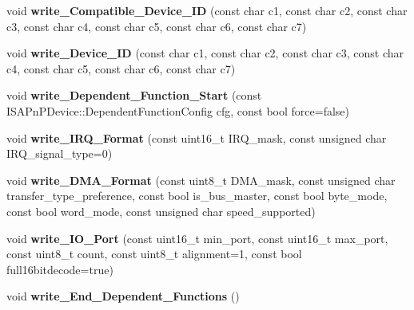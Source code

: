 \begin{DoxyCompactItemize}
\item 
\hypertarget{classISAPnPDevice_a82333984e29355de6aa136cbf42650f2}{void {\bfseries write\-\_\-\-Compatible\-\_\-\-Device\-\_\-\-I\-D} (const char c1, const char c2, const char c3, const char c4, const char c5, const char c6, const char c7)}\label{classISAPnPDevice_a82333984e29355de6aa136cbf42650f2}

\item 
\hypertarget{classISAPnPDevice_a78ce0d3cb8d04542b75360fdd5fdbe50}{void {\bfseries write\-\_\-\-Device\-\_\-\-I\-D} (const char c1, const char c2, const char c3, const char c4, const char c5, const char c6, const char c7)}\label{classISAPnPDevice_a78ce0d3cb8d04542b75360fdd5fdbe50}

\item 
\hypertarget{classISAPnPDevice_ab4252c5d2c75204386a1e5f16b0e0055}{void {\bfseries write\-\_\-\-Dependent\-\_\-\-Function\-\_\-\-Start} (const I\-S\-A\-Pn\-P\-Device\-::\-Dependent\-Function\-Config cfg, const bool force=false)}\label{classISAPnPDevice_ab4252c5d2c75204386a1e5f16b0e0055}

\item 
\hypertarget{classISAPnPDevice_a4b9d92daa7f3303e08504d731bba5b97}{void {\bfseries write\-\_\-\-I\-R\-Q\-\_\-\-Format} (const uint16\-\_\-t I\-R\-Q\-\_\-mask, const unsigned char I\-R\-Q\-\_\-signal\-\_\-type=0)}\label{classISAPnPDevice_a4b9d92daa7f3303e08504d731bba5b97}

\item 
\hypertarget{classISAPnPDevice_aa37664f583dfa6bbffe21b1efae1088f}{void {\bfseries write\-\_\-\-D\-M\-A\-\_\-\-Format} (const uint8\-\_\-t D\-M\-A\-\_\-mask, const unsigned char transfer\-\_\-type\-\_\-preference, const bool is\-\_\-bus\-\_\-master, const bool byte\-\_\-mode, const bool word\-\_\-mode, const unsigned char speed\-\_\-supported)}\label{classISAPnPDevice_aa37664f583dfa6bbffe21b1efae1088f}

\item 
\hypertarget{classISAPnPDevice_a5370ef1d69bd8bb5dd32b929763af73c}{void {\bfseries write\-\_\-\-I\-O\-\_\-\-Port} (const uint16\-\_\-t min\-\_\-port, const uint16\-\_\-t max\-\_\-port, const uint8\-\_\-t count, const uint8\-\_\-t alignment=1, const bool full16bitdecode=true)}\label{classISAPnPDevice_a5370ef1d69bd8bb5dd32b929763af73c}

\item 
\hypertarget{classISAPnPDevice_a2547f7a84bfc336a39fb0c0daeecde18}{void {\bfseries write\-\_\-\-End\-\_\-\-Dependent\-\_\-\-Functions} ()}\label{classISAPnPDevice_a2547f7a84bfc336a39fb0c0daeecde18}

\end{DoxyCompactItemize}
